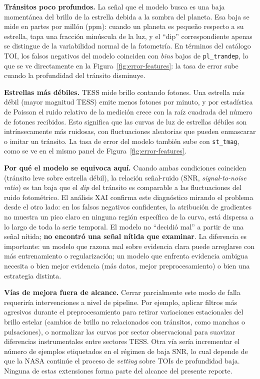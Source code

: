 \documentclass[11pt,a4paper]{article}
\begin{document}
\textbf{Tránsitos poco profundos.}
La señal que el modelo busca es una baja momentánea del brillo de la
estrella debida a la sombra del planeta. Esa baja se mide en partes
por millón (ppm): cuando un planeta es pequeño respecto a su
estrella, tapa una fracción minúscula de la luz, y el ``dip''
correspondiente apenas se distingue de la variabilidad normal de la
fotometría. En términos del catálogo TOI, los falsos negativos del
modelo coinciden con \textit{bins} bajos de \texttt{pl\_trandep}, lo
que se ve directamente en la Figura~\ref{fig:error-features}: la
tasa de error sube cuando la profundidad del tránsito disminuye.

\textbf{Estrellas más débiles.}
TESS mide brillo contando fotones. Una estrella más débil (mayor
magnitud TESS) emite menos fotones por minuto, y por estadística de
Poisson el ruido relativo de la medición crece con la raíz cuadrada
del número de fotones recibidos. Esto significa que las curvas de
luz de estrellas débiles son intrínsecamente más ruidosas, con
fluctuaciones aleatorias que pueden enmascarar o imitar un tránsito.
La tasa de error del modelo también sube con \texttt{st\_tmag}, como
se ve en el mismo panel de Figura~\ref{fig:error-features}.

\textbf{Por qué el modelo se equivoca aquí.}
Cuando ambas condiciones coinciden (tránsito leve sobre estrella
débil), la relación señal-ruido (SNR, \textit{signal-to-noise
ratio}) es tan baja que el \textit{dip} del tránsito es comparable a
las fluctuaciones del ruido fotométrico. El análisis XAI confirma
este diagnóstico mirando el problema desde el otro lado: en los
falsos negativos confidentes, la atribución de gradientes no muestra
un pico claro en ninguna región específica de la curva, está
dispersa a lo largo de toda la serie temporal. El modelo no
``decidió mal'' a partir de una señal nítida; \textbf{no encontró
una señal nítida que examinar}. La diferencia es importante: un
modelo que razona mal sobre evidencia clara puede arreglarse con
más entrenamiento o regularización; un modelo que enfrenta evidencia
ambigua necesita o bien mejor evidencia (más datos, mejor
preprocesamiento) o bien una estrategia distinta.

\textbf{Vías de mejora fuera de alcance.}
Cerrar parcialmente este modo de falla requeriría intervenciones a
nivel de pipeline. Por ejemplo, aplicar filtros más agresivos durante
el preprocesamiento para retirar variaciones estacionales del brillo
estelar (cambios de brillo no relacionados con tránsitos, como
manchas o pulsaciones), o normalizar las curvas por sector
observacional para suavizar diferencias instrumentales entre
sectores TESS. Otra vía sería incrementar el número de ejemplos
etiquetados en el régimen de baja SNR, lo cual depende de que la
NASA continúe el proceso de \textit{vetting} sobre TOIs de
profundidad baja. Ninguna de estas extensiones forma parte del
alcance del presente reporte.
\end{document}
